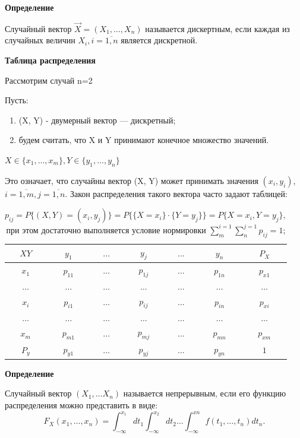 \textbf{Определение}

Случайный вектор $\overrightarrow{X} = (X_1, \dots, X_n)$ называется дискертным, если каждая из случайных величин $X_i, i=\overline{1,n}$ является дискретной.


\textbf{Таблица распределения}

Рассмотрим случай n=2

Пусть: 
\begin{enumerate}[label=\arabic*.]
	\item (X, Y) - двумерный вектор --- дискретный;
	\item будем считать, что X и Y принимают конечное множество значений.  
\end{enumerate}
$X \in \{x_1, \dots, x_m\}, Y \in \{y_1, \dots, y_n\}$

Это означает, что случайны вектор (X, Y) может принимать значения $(x_i, y_i)$, $i=\overline{1,m}, j=\overline{1,n}$. Закон распределения такого вектора часто задают таблицей:
 
\begin{table}[ht!]
	\begin{center}
		\caption{$p_{ij} = P\{(X, Y)=(x_i, y_j)\} = P\{\{X=x_i\} \cdot \{Y=y_j\}\} = P\{X=x_i, Y=y_j\}, $ при этом достаточно выполняется условие нормировки $\sum_{m}^{i=1}\sum_{n}^{j=1}p_{ij}=1$;}
		\label{tbl:sus}
		\begin{tabular}{|c|c|c|c|c|c|c|}
			\hline
			$XY$ & $y_1$ & $\dots$ & $y_j$ & $\dots$ &  $y_n$ & $P_X$\\  \hline
			$x_1$ & $p_{11}$ & $\dots$ & $p_{1j}$ & $\dots$ &  $p_{1n}$ & $p_{x1}$\\  \hline
			$\dots$ & $\dots$ & $\dots$ & $\dots$ & $\dots$ &  $\dots$ & $\dots$\\  \hline
			$x_i$ & $p_{i1}$ & $\dots$ & $p_{ij}$ & $\dots$ &  $p_{in}$ & $p_{xi}$\\  \hline
			$\dots$ & $\dots$ & $\dots$ & $\dots$ & $\dots$ &  $\dots$ & $\dots$\\ \hline
			$x_m$ & $p_{m1}$ & $\dots$ & $p_{mj}$ & $\dots$ &  $p_{mn}$ & $p_{xm}$\\  \hline
			$P_y$ & $p_{y1}$ & $\dots$ & $p_{yj}$ & $\dots$ &  $p_{yn}$ & $1$\\  
			\hline
		\end{tabular}
	\end{center}
\end{table}

\textbf{Определение}

Случайный вектор $(X_1, \dots X_n)$ называется непрерывным, если его функцию распределения можно представить в виде: 
\begin{equation}
	F_X(x_1, \dots, x_n) = \int_{-\infty}^{x_1}dt_1\int_{-\infty}^{x_2}dt_2 \dots
	\int_{-\infty}^{xn}f(t_1, \dots, t_n)dt_n.
\end{equation}


